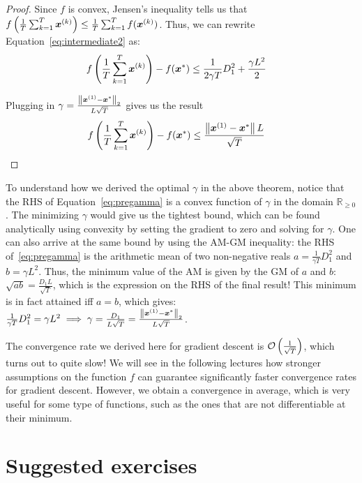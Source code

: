 \documentclass{article}
\newcommand{\R}{\mathbb{R}}
\begin{document}
\begin{proof}
Since $f$ is convex, Jensen's inequality tells us that $f\left(\frac{1}{T}\sum_{k=1}^T {\bm{x}}^{(k)}\right) \leq \frac{1}{T}\sum_{k=1}^T f({\bm{x}}^{(k)})$. Thus, we can rewrite Equation~\ref{eq:intermediate2} as:
\begin{align}
f\left(\frac{1}{T}\sum_{k=1}^T {\bm{x}}^{(k)}\right)-f({\bm{x}}^\ast) &\leq \frac{1}{2\gamma T} D_1^2 + \frac{\gamma L^2}{2} \label{eq:pregamma}
\end{align}

Plugging in $\gamma=\frac{\left\|{\bm{x}}^{(1)} - {\bm{x}}^\ast\right\|_2}{L \sqrt{T}}$ gives us the result
\begin{align*}
f\left(\frac{1}{T}\sum_{k=1}^T {\bm{x}}^{(k)}\right) - f({\bm{x}}^\ast) &\leq \frac{\left\|{\bm{x}}^{(1)} - {\bm{x}}^\ast\right\|L}{\sqrt{T}}
\end{align*}
\end{proof}

To understand how we derived the optimal $\gamma$ in the above theorem, notice that the RHS of Equation~\ref{eq:pregamma} is a convex function of $\gamma$ in the domain $\R_{\geq 0}$. 
The minimizing $\gamma$ would give us the tightest bound, which can be found analytically using convexity by setting the gradient to zero and solving for $\gamma$.
One can also arrive at the same bound by using the AM-GM inequality: the RHS of~\ref{eq:pregamma} is the arithmetic mean of two non-negative reals $a = \frac{1}{\gamma T} D_1^2$ and $b = \gamma L^2$.
Thus, the minimum value of the AM is given by the GM of $a$ and $b$: $\sqrt{ab} = \frac{D_1 L}{\sqrt{T}}$, which is the expression on the RHS of the final result!
This minimum is in fact attained iff $a = b$, which gives: $\frac{1}{\gamma T} D_1^2 = \gamma L^2\implies \gamma = \frac{D_1}{L\sqrt{T}} = \frac{\left\|{\bm{x}}^{(1)} - {\bm{x}}^\ast\right\|_2}{L \sqrt{T}}$.

The convergence rate we derived here for gradient descent is $\mathcal{O}\left(\frac{1}{\sqrt{T}}\right)$, which turns out to quite slow!
We will see in the following lectures how stronger assumptions on the function $f$ can guarantee significantly faster convergence rates for gradient descent. 
However, we obtain a convergence in average, which is very useful for some type of functions, such as the ones that are not differentiable at their minimum.


\section*{Suggested exercises}
\end{document}
